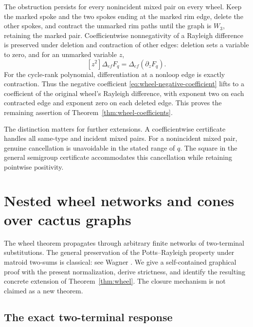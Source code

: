 \documentclass[11pt,a4paper]{article}
\theoremstyle{definition}
\theoremstyle{remark}\newtheorem{remark}[theorem]{Remark}
\begin{document}
The obstruction persists for every nonincident mixed pair on every
wheel. Keep the marked spoke and the two spokes ending at the marked
rim edge, delete the other spokes, and contract the unmarked rim paths
until the graph is $W_3$, retaining the marked pair.
Coefficientwise nonnegativity of a Rayleigh difference is preserved
under deletion and contraction of other edges: deletion sets a
variable to zero, and for an unmarked variable $z$,
\[
 [z^2]\Delta_{ef}F_q=\Delta_{ef}(\partial_zF_q).
\]
For the cycle-rank polynomial, differentiation at a nonloop edge is
exactly contraction. Thus the negative coefficient
\eqref{eq:wheel-negative-coefficient} lifts to a coefficient of the
original wheel's Rayleigh difference, with exponent two on each
contracted edge and exponent zero on each deleted edge. This proves
the remaining assertion of Theorem~\ref{thm:wheel-coefficients}.

The distinction matters for further extensions. A coefficientwise
certificate handles all same-type and incident mixed pairs. For a
nonincident mixed pair, genuine cancellation is unavoidable in the
stated range of $q$. The square in the general semigroup certificate
accommodates this cancellation while retaining pointwise positivity.


\section{Nested wheel networks and cones over cactus graphs}
\label{sec:wheel-composition}

The wheel theorem propagates through arbitrary finite networks of
two-terminal substitutions. The general preservation of the Potts--Rayleigh
property under matroid two-sums is classical: see Wagner
\cite[Theorem~5.8(d)]{Wagner2008}. We give a self-contained graphical
proof with the present normalization, derive strictness, and identify
the resulting concrete extension of Theorem~\ref{thm:wheel}.
The closure mechanism is not claimed as a new theorem.

\subsection{The exact two-terminal response}
\end{document}
